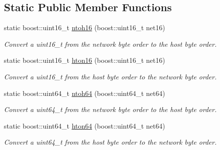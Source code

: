 \subsection*{Static Public Member Functions}
\begin{DoxyCompactItemize}
\item 
static boost\+::uint16\+\_\+t \hyperlink{classwebsocket_1_1DataframeParser_abfb0ab043395dd9d4ce1506a792343db}{ntoh16} (boost\+::uint16\+\_\+t net16)
\begin{DoxyCompactList}\small\item\em Convert a uint16\+\_\+t from the network byte order to the host byte order. \end{DoxyCompactList}\item 
static boost\+::uint16\+\_\+t \hyperlink{classwebsocket_1_1DataframeParser_a1d56019ba8f427984da01a3c206b4226}{hton16} (boost\+::uint16\+\_\+t net16)
\begin{DoxyCompactList}\small\item\em Convert a uint16\+\_\+t from the host byte order to the network byte order. \end{DoxyCompactList}\item 
static boost\+::uint64\+\_\+t \hyperlink{classwebsocket_1_1DataframeParser_abbc453c45e690c07a01a3d8a5c7560b8}{ntoh64} (boost\+::uint64\+\_\+t net64)
\begin{DoxyCompactList}\small\item\em Convert a uint64\+\_\+t from the network byte order to the host byte order. \end{DoxyCompactList}\item 
static boost\+::uint64\+\_\+t \hyperlink{classwebsocket_1_1DataframeParser_ac0ffb851ee6870bc8672ef6408fce939}{hton64} (boost\+::uint64\+\_\+t net64)
\begin{DoxyCompactList}\small\item\em Convert a uint64\+\_\+t from the host byte order to the network byte order. \end{DoxyCompactList}\end{DoxyCompactItemize}

